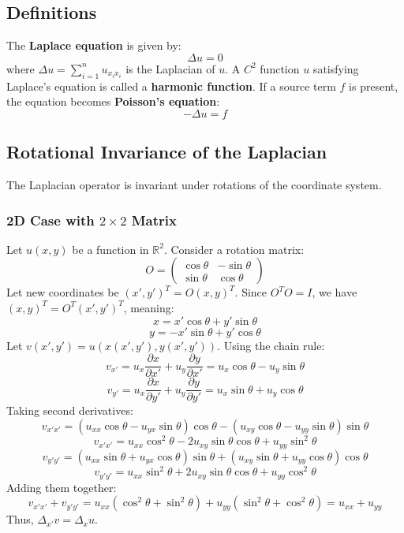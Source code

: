 \documentclass[11pt]{article}
\theoremstyle{plain}
\theoremstyle{definition}
\theoremstyle{remark}
\begin{document}
\subsection{Definitions}
The \textbf{Laplace equation} is given by:
$$ \Delta u = 0 $$
where $\Delta u = \sum_{i=1}^n u_{x_i x_i}$ is the Laplacian of $u$. A $C^2$ function $u$ satisfying Laplace's equation is called a \textbf{harmonic function}. 
If a source term $f$ is present, the equation becomes \textbf{Poisson's equation}:
$$ -\Delta u = f $$

\subsection{Rotational Invariance of the Laplacian}\label{ssec:rotinv}
The Laplacian operator is invariant under rotations of the coordinate system.

\subsubsection{2D Case with $2 \times 2$ Matrix}
Let $u(x,y)$ be a function in $\mathbb{R}^2$. Consider a rotation matrix:
$$ O = \begin{pmatrix} \cos\theta & -\sin\theta \\ \sin\theta & \cos\theta \end{pmatrix} $$
Let new coordinates be $(x', y')^T = O (x,y)^T$. Since $O^T O = I$, we have $(x,y)^T = O^T (x', y')^T$, meaning:
$$ x = x' \cos\theta + y' \sin\theta $$
$$ y = -x' \sin\theta + y' \cos\theta $$
Let $v(x', y') = u(x(x',y'), y(x',y'))$. Using the chain rule:
$$ v_{x'} = u_x \frac{\partial x}{\partial x'} + u_y \frac{\partial y}{\partial x'} = u_x \cos\theta - u_y \sin\theta $$
$$ v_{y'} = u_x \frac{\partial x}{\partial y'} + u_y \frac{\partial y}{\partial y'} = u_x \sin\theta + u_y \cos\theta $$
Taking second derivatives:
$$ v_{x'x'} = (u_{xx} \cos\theta - u_{yx} \sin\theta)\cos\theta - (u_{xy} \cos\theta - u_{yy} \sin\theta)\sin\theta $$
$$ v_{x'x'} = u_{xx} \cos^2\theta - 2u_{xy} \sin\theta \cos\theta + u_{yy} \sin^2\theta $$
$$ v_{y'y'} = (u_{xx} \sin\theta + u_{yx} \cos\theta)\sin\theta + (u_{xy} \sin\theta + u_{yy} \cos\theta)\cos\theta $$
$$ v_{y'y'} = u_{xx} \sin^2\theta + 2u_{xy} \sin\theta \cos\theta + u_{yy} \cos^2\theta $$
Adding them together:
$$ v_{x'x'} + v_{y'y'} = u_{xx}(\cos^2\theta + \sin^2\theta) + u_{yy}(\sin^2\theta + \cos^2\theta) = u_{xx} + u_{yy} $$
Thus, $\Delta_{x'} v = \Delta_{x} u$.
\end{document}
